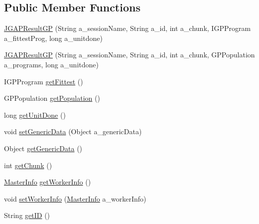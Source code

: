 \subsection*{Public Member Functions}
\begin{DoxyCompactItemize}
\item 
\hyperlink{classorg_1_1jgap_1_1distr_1_1grid_1_1gp_1_1_j_g_a_p_result_g_p_a5df026b60ed9712890fbf6078eb59552}{J\-G\-A\-P\-Result\-G\-P} (String a\-\_\-session\-Name, String a\-\_\-id, int a\-\_\-chunk, I\-G\-P\-Program a\-\_\-fittest\-Prog, long a\-\_\-unitdone)
\item 
\hyperlink{classorg_1_1jgap_1_1distr_1_1grid_1_1gp_1_1_j_g_a_p_result_g_p_a534bf79f1b2fac3add0139edeea57e37}{J\-G\-A\-P\-Result\-G\-P} (String a\-\_\-session\-Name, String a\-\_\-id, int a\-\_\-chunk, G\-P\-Population a\-\_\-programs, long a\-\_\-unitdone)
\item 
I\-G\-P\-Program \hyperlink{classorg_1_1jgap_1_1distr_1_1grid_1_1gp_1_1_j_g_a_p_result_g_p_a9b9f0ef167c810310a32b98521adc8c7}{get\-Fittest} ()
\item 
G\-P\-Population \hyperlink{classorg_1_1jgap_1_1distr_1_1grid_1_1gp_1_1_j_g_a_p_result_g_p_a003bc42f396643cbab1b4e9e10979b2a}{get\-Population} ()
\item 
long \hyperlink{classorg_1_1jgap_1_1distr_1_1grid_1_1gp_1_1_j_g_a_p_result_g_p_acd82f8a07de8bcd3b753cbee7116e899}{get\-Unit\-Done} ()
\item 
void \hyperlink{classorg_1_1jgap_1_1distr_1_1grid_1_1gp_1_1_j_g_a_p_result_g_p_ae9b14d36d76989e7eafb06dd0fb8b985}{set\-Generic\-Data} (Object a\-\_\-generic\-Data)
\item 
Object \hyperlink{classorg_1_1jgap_1_1distr_1_1grid_1_1gp_1_1_j_g_a_p_result_g_p_a55ed20fa4c267c9af4b801ae0780b612}{get\-Generic\-Data} ()
\item 
int \hyperlink{classorg_1_1jgap_1_1distr_1_1grid_1_1gp_1_1_j_g_a_p_result_g_p_a49b31c7b36d46db48acdb2ee1d3d1ae9}{get\-Chunk} ()
\item 
\hyperlink{classorg_1_1jgap_1_1distr_1_1_master_info}{Master\-Info} \hyperlink{classorg_1_1jgap_1_1distr_1_1grid_1_1gp_1_1_j_g_a_p_result_g_p_a32c5338f225405c92f2ad28cb966d00b}{get\-Worker\-Info} ()
\item 
void \hyperlink{classorg_1_1jgap_1_1distr_1_1grid_1_1gp_1_1_j_g_a_p_result_g_p_a7557dc32464d4c21192065b63ffe77d8}{set\-Worker\-Info} (\hyperlink{classorg_1_1jgap_1_1distr_1_1_master_info}{Master\-Info} a\-\_\-worker\-Info)
\item 
String \hyperlink{classorg_1_1jgap_1_1distr_1_1grid_1_1gp_1_1_j_g_a_p_result_g_p_a5c632c2ea26db15542890f30e0b64daa}{get\-I\-D} ()

\end{DoxyCompactItemize}
